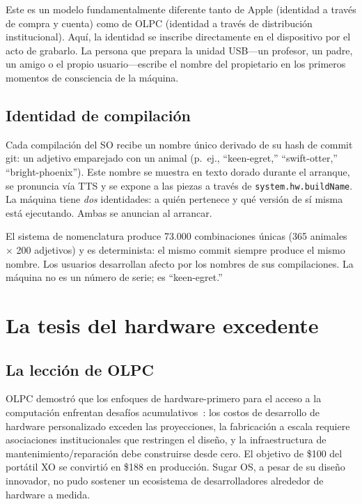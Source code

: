 \documentclass[10pt,letterpaper,twocolumn]{article}
\begin{document}
Este es un modelo fundamentalmente diferente tanto de Apple (identidad a través de compra y cuenta) como de OLPC (identidad a través de distribución institucional). Aquí, la identidad se inscribe directamente en el dispositivo por el acto de grabarlo. La persona que prepara la unidad USB---un profesor, un padre, un amigo o el propio usuario---escribe el nombre del propietario en los primeros momentos de consciencia de la máquina.

\subsection{Identidad de compilación}

Cada compilación del SO recibe un nombre único derivado de su hash de commit git: un adjetivo emparejado con un animal (p.~ej., ``keen-egret,'' ``swift-otter,'' ``bright-phoenix''). Este nombre se muestra en texto dorado durante el arranque, se pronuncia vía TTS y se expone a las piezas a través de \texttt{system.hw.buildName}. La máquina tiene \emph{dos} identidades: a quién pertenece y qué versión de sí misma está ejecutando. Ambas se anuncian al arrancar.

El sistema de nomenclatura produce 73.000 combinaciones únicas (365 animales $\times$ 200 adjetivos) y es determinista: el mismo commit siempre produce el mismo nombre. Los usuarios desarrollan afecto por los nombres de sus compilaciones. La máquina no es un número de serie; es ``keen-egret.''

\section{La tesis del hardware excedente}
\label{sec:surplus}

\subsection{La lección de OLPC}

OLPC demostró que los enfoques de hardware-primero para el acceso a la computación enfrentan desafíos acumulativos~\citep{kraemer2009olpc}: los costos de desarrollo de hardware personalizado exceden las proyecciones, la fabricación a escala requiere asociaciones institucionales que restringen el diseño, y la infraestructura de mantenimiento/reparación debe construirse desde cero. El objetivo de \$100 del portátil XO se convirtió en \$188 en producción. Sugar OS, a pesar de su diseño innovador, no pudo sostener un ecosistema de desarrolladores alrededor de hardware a medida.
\end{document}
